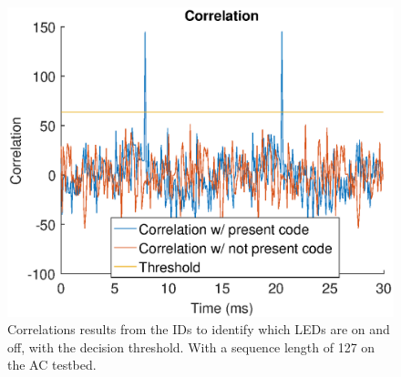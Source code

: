 \begin{figure}[ht]
	\centering
	\includegraphics[angle=0,width=\textwidth,keepaspectratio]{chapters/evaluation-chapters/hardware/ac/correlation-ac-testbed.eps}
	\caption{Correlations results from the IDs to identify which LEDs are on and off, with the decision threshold. With a sequence length of 127 on the AC testbed.}
	\label{fig:correlation-ac-testbed}
\end{figure}


